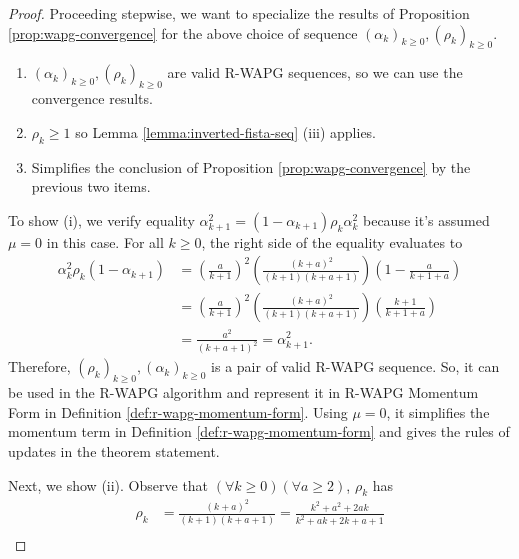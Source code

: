 \documentclass[12pt]{article}
\begin{document}
    \begin{proof}
        Proceeding stepwise, we want to specialize the results of Proposition \ref{prop:wapg-convergence} for the above choice of sequence $(\alpha_k)_{k \ge 0}, (\rho_k)_{k \ge 0}$. 
        \begin{enumerate}
            \item $(\alpha_k)_{k \ge 0}, (\rho_k)_{k \ge 0}$ are valid R-WAPG sequences, so we can use the convergence results. 
            \item $\rho_k \ge 1$ so Lemma \ref{lemma:inverted-fista-seq} (iii) applies. 
            \item Simplifies the conclusion of Proposition \ref{prop:wapg-convergence} by the previous two items. 
        \end{enumerate}
        To show (i), we verify equality $\alpha_{k + 1}^2 = (1 - \alpha_{k + 1})\rho_k \alpha_k^2$ because it's assumed $\mu = 0$ in this case. 
        For all $k \ge 0$, the right side of the equality evaluates to 
        \begin{align*}
            \alpha_k^2 \rho_k(1 - \alpha_{k + 1}) &= 
            \left(
                \frac{a}{k + 1}
            \right)^2 \left(
                \frac{(k + a)^2}{(k + 1)(k + a + 1)}
            \right)
            \left(
                1 - \frac{a}{k + 1 + a}
            \right)
            \\
            &= \left(
                \frac{a}{k + 1}
            \right)^2 \left(
                \frac{(k + a)^2}{(k + 1)(k + a + 1)}
            \right)
            \left(
                \frac{k + 1}{k + 1 + a}
            \right)
            \\
            &= \frac{a^2}{(k + a + 1)^2} = \alpha_{k + 1}^2. 
        \end{align*}
        Therefore, $(\rho_k)_{k \ge 0}, (\alpha_k)_{k \ge 0}$ is a pair of valid R-WAPG sequence. 
        So, it can be used in the R-WAPG algorithm and represent it in R-WAPG Momentum Form in Definition \ref{def:r-wapg-momentum-form}. 
        Using $\mu = 0$, it simplifies the momentum term in Definition \ref{def:r-wapg-momentum-form} and gives the rules of updates in the theorem statement. 
        \par
        Next, we show (ii). 
        Observe that $(\forall k \ge 0)(\forall a \ge 2)$, $\rho_k$ has 
        \begin{align*}
            \rho_k &= \frac{(k + a)^2}{(k + 1)(k + a + 1)} = \frac{k^2 + a^2 + 2ak}{k^2 + ak + 2k + a + 1}
            \\

\end{align*}
\end{proof}
\end{document}
